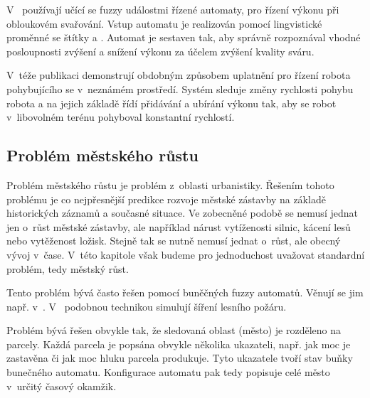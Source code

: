 
V~\cite{TzaRig-StaAnaAdaFuzzConSysUsiPetrNetLeaAut} používají učící se fuzzy událostmi řízené automaty, pro řízení výkonu při obloukovém svařování. Vstup automatu je realizován pomocí lingvistické proměnné  se štítky  a . Automat je sestaven tak, aby správně rozpoznával vhodné posloupnosti zvýšení a snížení výkonu za účelem zvýšení kvality sváru. 

V~téže publikaci demonstrují obdobným způsobem uplatnění pro řízení robota pohybujícího se v~neznámém prostředí. Systém sleduje změny rychlosti pohybu robota a na jejich základě řídí přidávání a ubírání výkonu tak, aby se robot v~libovolném terénu pohyboval konstantní rychlostí.

\subsection{Problém městského růstu} \label{subs:UrbGrow}
Problém městského růstu je problém z~oblasti urbanistiky. Řešením tohoto problému je co nejpřesnější predikce rozvoje městské zástavby na základě historických záznamů a současné situace. Ve zobecněné podobě se nemusí jednat jen o~růst městské zástavby, ale například nárust vytíženosti silnic, kácení lesů nebo vytěženost ložisk. Stejně tak se nutně nemusí jednat o~růst, ale obecný vývoj v~čase. V~této kapitole však budeme pro jednoduchost uvažovat standardní problém, tedy městský růst.

Tento problém bývá často řešen pomocí buněčných fuzzy automatů. Věnují se jim např. v~\cite{AlAhHep+-ModUrbGroDynUsCelAutGIS, Ahm+-CalFuzCelAutModUrbDynSauAr, War+-StoConCelModUrbGro, WhiEng-CelAutBasIntDynRegMod, LaiDraSch-IntMulEvCelAutMetLanSimMod, ManHatPra-FuzCelAutBasSheModUrGro+, ManHatPra-ModUrbGroUsFuzCelAut, Wu-CalStoCelAutAppRurUrbLanConv, PowSimWhi-HieFuzzPattMatcRegCompLanUseMap, Dra-CouFuzSetTheGisBaCelAutLanUseChaMod, WasPar-PreSpaDisEleEnCon+, LiuPhi-DevCelAutModUrbGroIncFuzSetApp}. V~\cite{MraZimLapBaj-FuzCelAut+} podobnou technikou simulují šíření lesního požáru.

Problém bývá řešen obvykle tak, že sledovaná oblast (město) je rozděleno na parcely. Každá parcela je popsána obvykle několika ukazateli, např. jak moc je zastavěna či jak moc hluku parcela produkuje. Tyto ukazatele tvoří stav buňky bunečného automatu. Konfigurace automatu pak tedy popisuje celé město v~určitý časový okamžik.

